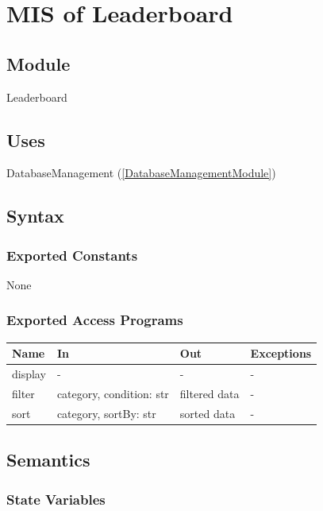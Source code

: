 \documentclass[12pt, titlepage]{article}
\begin{document}
\newpage

\section{MIS of Leaderboard} \label{LeaderboardModule}

\subsection{Module}

Leaderboard

\subsection{Uses}

DatabaseManagement (\ref{DatabaseManagementModule})

\subsection{Syntax}

\subsubsection{Exported Constants}

None

\subsubsection{Exported Access Programs}

\begin{center}
\begin{tabular}{p{2cm} p{4cm} p{4cm} p{2cm}}
\hline
\textbf{Name} & \textbf{In} & \textbf{Out} & \textbf{Exceptions} \\
\hline
display & - & - & - \\
filter & category, condition: str & filtered data & - \\
sort & category, sortBy: str & sorted data & - \\
\hline
\end{tabular}
\end{center}

\subsection{Semantics}

\subsubsection{State Variables}
\end{document}
